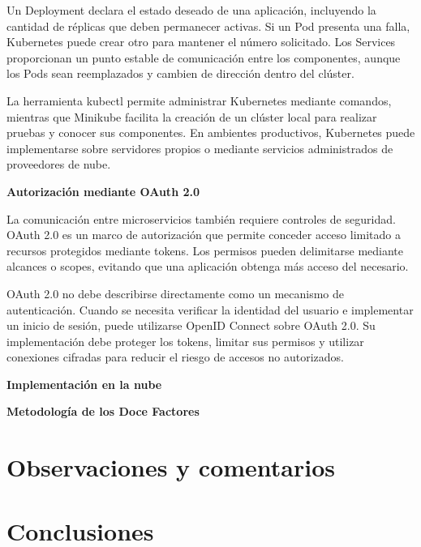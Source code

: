 \documentclass[12pt]{article}
\begin{document}
	Un Deployment declara el estado deseado de una aplicación, incluyendo la
	cantidad de réplicas que deben permanecer activas. Si un Pod presenta una falla,
	Kubernetes puede crear otro para mantener el número solicitado. Los Services
	proporcionan un punto estable de comunicación entre los componentes, aunque los
	Pods sean reemplazados y cambien de dirección dentro del clúster.
	
	La herramienta kubectl permite administrar Kubernetes mediante comandos,
	mientras que Minikube facilita la creación de un clúster local para realizar
	pruebas y conocer sus componentes. En ambientes productivos, Kubernetes puede
	implementarse sobre servidores propios o mediante servicios administrados de
	proveedores de nube.
	
	\noindent\textbf{Autorización mediante OAuth 2.0}
	
	La comunicación entre microservicios también requiere controles de seguridad.
	OAuth 2.0 es un marco de autorización que permite conceder acceso limitado a
	recursos protegidos mediante tokens. Los permisos pueden delimitarse mediante
	alcances o scopes, evitando que una aplicación obtenga más acceso del
	necesario.
	
	OAuth 2.0 no debe describirse directamente como un mecanismo de autenticación.
	Cuando se necesita verificar la identidad del usuario e implementar un inicio
	de sesión, puede utilizarse OpenID Connect sobre OAuth 2.0. Su implementación
	debe proteger los tokens, limitar sus permisos y utilizar conexiones cifradas
	para reducir el riesgo de accesos no autorizados.
	
	\noindent\textbf{Implementación en la nube}
	
	\noindent\textbf{Metodología de los Doce Factores}
		
	\section*{Observaciones y comentarios}
	

	
	\section*{Conclusiones}
	
\end{document}
